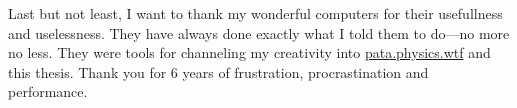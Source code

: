 \spirals

Last but not least, I want to thank my wonderful computers for their usefullness and uselessness. They have always done exactly what I told them to do---no more no less. They were tools for channeling my creativity into \url{pata.physics.wtf} and this thesis. Thank you for 6 years of frustration, procrastination and performance.










\clearpage

